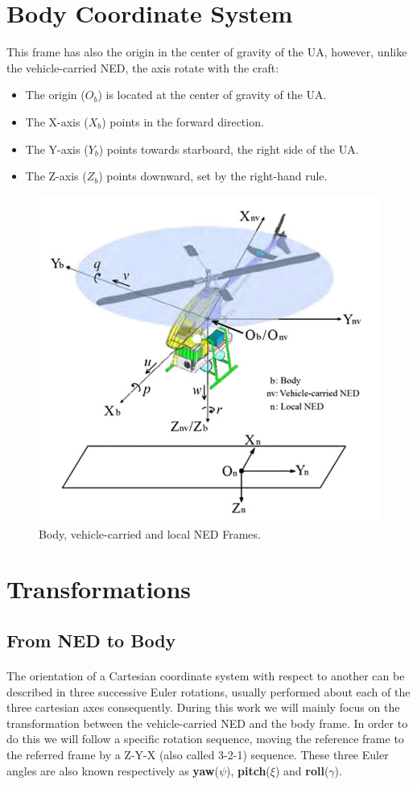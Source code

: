 \section{Body Coordinate System}\label{sec:body}
This frame has also the origin in the center of gravity of the UA, however, unlike the vehicle-carried NED, the axis rotate with the craft:
\begin{itemize}
\item{The origin (\textbf{$O_{b}$}) is located at the center of gravity of the UA.}
\item{The X-axis (\textbf{$X_{b}$}) points in the forward direction.}
\item{The Y-axis (\textbf{$Y_{b}$}) points towards starboard, the right side of the UA.}
\item{The Z-axis (\textbf{$Z_{b}$}) points downward, set by the right-hand rule.}
\end{itemize}
\begin{figure}[H]
   \centering
    \includegraphics[width=.70\textwidth]{figures/NEDtemp1.png} 
    \caption{Body, vehicle-carried and local NED Frames.}  
    \label{fig:NED1}
\end{figure}

\section{Transformations}\label{sec:body}

\subsection*{From NED to Body}
\paragraph{} The orientation of a Cartesian coordinate system with respect to another can be described in three successive Euler rotations, usually performed about each of the three cartesian axes consequently. During this work we will mainly focus on the transformation between the vehicle-carried NED and the body frame. In order to do this we will follow a specific rotation sequence, moving the reference frame to the referred frame by a Z-Y-X (also called 3-2-1) sequence. These three Euler angles are also known respectively as \textbf{yaw}($\psi$), \textbf{pitch}($\xi$) and \textbf{roll}($\gamma$).


